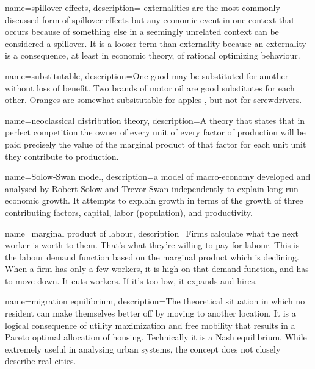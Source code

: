 {
name=spillover effects,
description={ \Gls{externalities} are the most commonly discussed form of spillover effects but any economic event in one context that occurs because of something else in a seemingly unrelated context can be considered a spillover. It is a looser term than externality because an externality is a consequence, at least in economic theory, of rational optimizing behaviour.}
}

{
name=substitutable,
description={One good may be substituted for another without loss of benefit. Two brands of motor oil are good substitutes for each other. Oranges are somewhat subsitutable for apples , but not for screwdrivers.}
}

{
name=neoclassical distribution theory,
description={A theory that states that in perfect competition the owner of every unit of every  \gls{factor of production} will be paid precisely the  value of the \gls{marginal product} of that factor for each unit unit they contribute to production.}
}

{
name=Solow-Swan model,
description={a  model of macro-economy developed and analysed by Robert Solow and Trevor Swan independently to explain long-run economic growth.\cite{dimandTrevorSwanNeoclassical2009} It attempts to explain  growth in terms of the growth of three contributing factors, capital, labor (population),  and  productivity.}
}

{
name=marginal product of labour,
description={Firms calculate what the next worker is worth to them. That's what they're willing to pay for labour. 
This is the labour \gls{demand function} based on the \gls{marginal product} which is declining. When a firm has only a few workers, it is high on that demand function, and has to move down. It cuts workers. If it's too low, it expands and hires. %
}
}

{
name=migration equilibrium,
description={The theoretical situation in which no resident can  make themselves better off by moving to another location. It is a logical consequence of utility maximization and free mobility that results in a Pareto optimal allocation of housing. Technically it is a Nash equilibrium, While extremely useful in analysing urban systems, the concept does not closely describe real cities.
}
}

